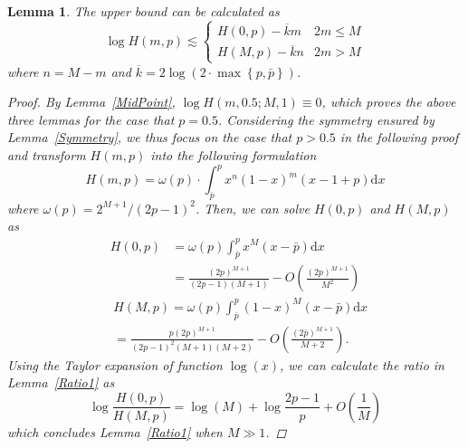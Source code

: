 \documentclass{article}
\newtheorem{lemma}[theorem]{Lemma}
\begin{document}
\begin{lemma}
\label{UpBound1}
The upper bound can be calculated as
\begin{equation*}
\log H(m,p)\lesssim \left\{
    \begin{array}{cl}
    H(0,p)- \overline{k}m& 2m\leq M\\
    H(M,p)- \overline{k}n& 2m>M
    \end{array}\right.
\end{equation*}
where $n=M-m$ and $\overline{k}=2\log\left(2\cdot \max\left\{p,\bar{p}\right\}\right)$.
\begin{proof}
By Lemma~\ref{MidPoint}, $\log H(m, 0.5;M,1)\equiv 0$, which proves the above three lemmas for the case that $p=0.5$. Considering the symmetry ensured by Lemma~\ref{Symmetry}, we thus focus on the case that $p>0.5$ in the following proof and transform $H(m,p)$ into the following formulation
\begin{equation}
H(m,p)=\omega(p)\cdot \int_{\bar{p}}^{p}x^n(1-x)^m(x-1+p)\mathrm{d}x
\end{equation}
where $\omega(p)=2^{M+1}/(2p-1)^2$. Then, we can solve $H(0,p)$ and $H(M,p)$ as
\begin{equation}
\begin{split}
H(0,p)&=\omega(p)\int_{\bar{p}}^{p}x^M(x-\bar{p})\mathrm{d}x\\
&=\frac{(2p)^{M+1}}{(2p-1)(M+1)} - O\left(\frac{(2p)^{M+1}}{M^2}\right)
\end{split}
\end{equation}
\begin{equation}
\begin{split}
&H(M,p)=\omega(p)\int_{\bar{p}}^{p}(1-x)^M(x-\bar{p})\mathrm{d}x\\
&=\frac{p(2p)^{M+1}}{(2p-1)^2(M+1)(M+2)} - O\left(\frac{(2\bar{p})^{M+1}}{M+2}\right).
\end{split}
\end{equation}
Using the Taylor expansion of function $\log(x)$, we can calculate the ratio in Lemma~\ref{Ratio1} as
\begin{equation}
\log\frac{H(0,p)}{H(M,p)}=\log(M)+\log\frac{2p-1}{p}+O\left(\frac{1}{M}\right)
\end{equation}
which concludes Lemma~\ref{Ratio1} when $M\gg 1$.


\end{proof}
\end{lemma}
\end{document}
